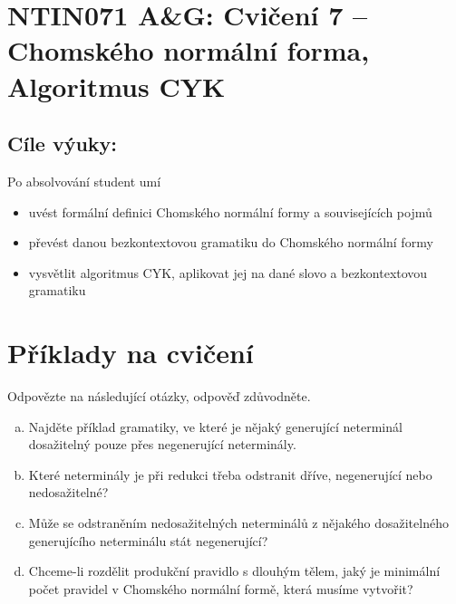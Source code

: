 \documentclass[a4paper,12pt]{amsart}
\begin{document}
\thispagestyle{empty}

\section*{NTIN071 A\&G: Cvičení 7 -- Chomského normální forma, Algoritmus CYK}

\medskip

\subsection*{Cíle výuky:} Po absolvování student umí

\begin{itemize}\setlength{\itemsep}{0pt}
    \item uvést formální definici Chomského normální formy a souvisejících pojmů
    \item převést danou bezkontextovou gramatiku do Chomského normální formy
    \item vysvětlit algoritmus CYK, aplikovat jej na dané slovo a bezkontextovou gramatiku
\end{itemize}

\section*{Příklady na cvičení}

\medskip\begin{problem}
    
    Odpovězte na následující otázky, odpověď zdůvodněte.
    
    \begin{enumerate}[(a)]\setlength{\itemsep}{6pt}
        \item Najděte příklad gramatiky, ve které je nějaký generující neterminál dosažitelný pouze přes negenerující neterminály.
        \item Které neterminály je při redukci třeba odstranit dříve, negenerující nebo nedosažitelné?
        \item Může se odstraněním nedosažitelných neterminálů z nějakého dosažitelného generujícího neterminálu stát negenerující?
        \item Chceme-li rozdělit produkční pravidlo s dlouhým tělem, jaký je minimální počet pravidel v Chomského normální formě, která musíme vytvořit?
    \end{enumerate}

\end{problem}
    
\end{document}
